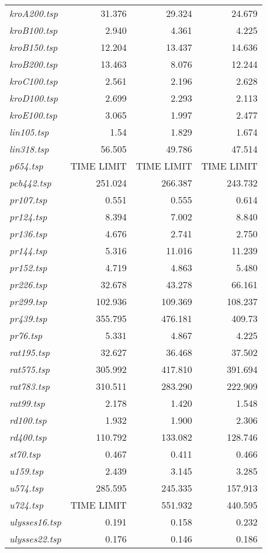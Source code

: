 {\begin{longtable}[H]{lrrr}
\textit{kroA200.tsp} & 31.376 & 29.324 & 24.679\\
\textit{kroB100.tsp} & 2.940 & 4.361 & 4.225\\
\textit{kroB150.tsp} & 12.204 & 13.437 & 14.636\\
\textit{kroB200.tsp} & 13.463 & 8.076 & 12.244\\
\textit{kroC100.tsp} & 2.561 & 2.196 & 2.628\\
\textit{kroD100.tsp} & 2.699 & 2.293 & 2.113\\
\textit{kroE100.tsp} & 3.065 & 1.997 & 2.477\\
\textit{lin105.tsp} & 1.54 & 1.829 & 1.674\\
\textit{lin318.tsp} & 56.505 & 49.786 & 47.514\\
\textit{p654.tsp} & TIME LIMIT & TIME LIMIT & TIME LIMIT\\
\textit{pcb442.tsp} & 251.024 & 266.387 & 243.732\\
\textit{pr107.tsp} & 0.551 & 0.555 & 0.614\\
\textit{pr124.tsp} & 8.394 & 7.002 & 8.840\\
\textit{pr136.tsp} & 4.676 & 2.741 & 2.750\\
\textit{pr144.tsp} & 5.316 & 11.016 & 11.239\\
\textit{pr152.tsp} & 4.719 & 4.863 & 5.480\\
\textit{pr226.tsp} & 32.678 & 43.278 & 66.161\\
\textit{pr299.tsp} & 102.936 & 109.369 & 108.237\\
\textit{pr439.tsp} & 355.795 & 476.181 & 409.73\\
\textit{pr76.tsp} & 5.331 & 4.867 & 4.225\\
\textit{rat195.tsp} & 32.627 & 36.468 & 37.502\\
\textit{rat575.tsp} & 305.992 & 417.810 & 391.694\\
\textit{rat783.tsp} & 310.511 & 283.290 & 222.909\\
\textit{rat99.tsp} & 2.178 & 1.420 & 1.548\\
\textit{rd100.tsp} & 1.932 & 1.900 & 2.306\\
\textit{rd400.tsp} & 110.792 & 133.082 & 128.746\\
\textit{st70.tsp} & 0.467 & 0.411 & 0.466\\
\textit{u159.tsp} & 2.439 & 3.145 & 3.285\\
\textit{u574.tsp} & 285.595 & 245.335 & 157.913\\
\textit{u724.tsp} & TIME LIMIT & 551.932 & 440.595\\
\textit{ulysses16.tsp} & 0.191 & 0.158 & 0.232\\
\textit{ulysses22.tsp} & 0.176 & 0.146 & 0.186\\
\hline
\end{longtable}
}

